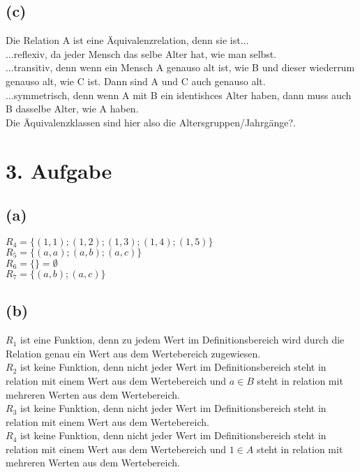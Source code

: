 \documentclass[]{article}
\begin{document}
\subsection*{(c)}
	Die Relation A ist eine Äquivalenzrelation, denn sie ist...\\
	...reflexiv, da jeder Mensch das selbe Alter hat, wie man selbst.\\
	...transitiv, denn wenn ein Mensch A genauso alt ist, wie B und dieser wiederrum genauso alt, wie C ist. Dann sind A und C auch genauso alt.\\
	...symmetrisch, denn wenn A mit B ein identishces Alter haben, dann muss auch B dasselbe Alter, wie A haben.\\
	Die Äquivalenzklassen sind hier also die Altersgruppen/Jahrgänge?.

\section*{3. Aufgabe}
\subsection*{(a)}
	$R_4 = \{(1,1);(1,2);(1,3);(1,4);(1,5)\}$\\
	$R_5 = \{(a,a); (a,b); (a,c)\}$\\
	$R_6 = \{\} = \emptyset$\\
	$R_7 = \{(a,b); (a,c)\}$
\subsection*{(b)}
	$R_1$ ist eine Funktion, denn zu jedem Wert im Definitionsbereich wird durch die Relation genau ein Wert aus dem Wertebereich zugewiesen.\\

	$R_2$ ist keine Funktion, denn nicht jeder Wert im Definitionsbereich steht in relation mit einem Wert aus dem Wertebereich und $a \in B$ steht in relation mit mehreren Werten aus dem Wertebereich.\\

	$R_3$ ist keine Funktion, denn nicht jeder Wert im Definitionsbereich steht in relation mit einem Wert aus dem Wertebereich.\\

	$R_4$ ist keine Funktion, denn nicht jeder Wert im Definitionsbereich steht in relation mit einem Wert aus dem Wertebereich und $1 \in A$ steht in relation mit mehreren Werten aus dem Wertebereich.\\
\end{document}
